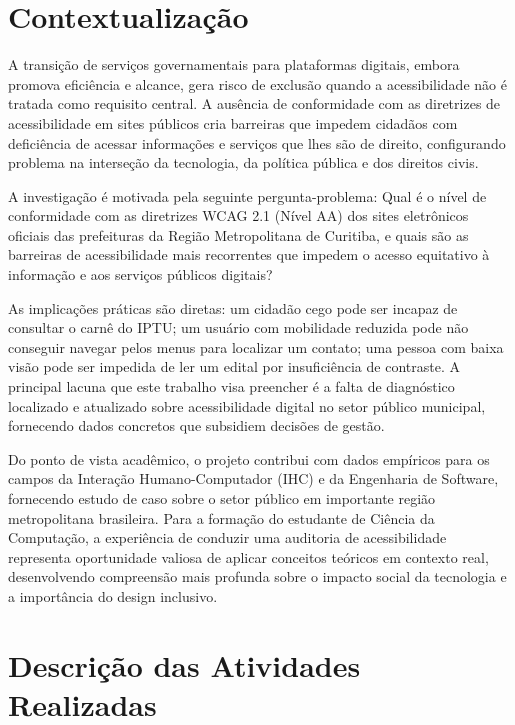 \documentclass[brazil]{ifpr-pinhais}
\begin{document}
\chapter{Contextualização}

A transição de serviços governamentais para plataformas digitais, embora promova eficiência e alcance, gera risco de exclusão quando a acessibilidade não é tratada como requisito central. A ausência de conformidade com as diretrizes de acessibilidade em sites públicos cria barreiras que impedem cidadãos com deficiência de acessar informações e serviços que lhes são de direito, configurando problema na interseção da tecnologia, da política pública e dos direitos civis.

A investigação é motivada pela seguinte pergunta-problema: Qual é o nível de conformidade com as diretrizes WCAG 2.1 (Nível AA) dos sites eletrônicos oficiais das prefeituras da Região Metropolitana de Curitiba, e quais são as barreiras de acessibilidade mais recorrentes que impedem o acesso equitativo à informação e aos serviços públicos digitais?

As implicações práticas são diretas: um cidadão cego pode ser incapaz de consultar o carnê do IPTU; um usuário com mobilidade reduzida pode não conseguir navegar pelos menus para localizar um contato; uma pessoa com baixa visão pode ser impedida de ler um edital por insuficiência de contraste. A principal lacuna que este trabalho visa preencher é a falta de diagnóstico localizado e atualizado sobre acessibilidade digital no setor público municipal, fornecendo dados concretos que subsidiem decisões de gestão.

Do ponto de vista acadêmico, o projeto contribui com dados empíricos para os campos da Interação Humano-Computador (IHC) e da Engenharia de Software, fornecendo estudo de caso sobre o setor público em importante região metropolitana brasileira. Para a formação do estudante de Ciência da Computação, a experiência de conduzir uma auditoria de acessibilidade representa oportunidade valiosa de aplicar conceitos teóricos em contexto real, desenvolvendo compreensão mais profunda sobre o impacto social da tecnologia e a importância do design inclusivo.

\chapter{Descrição das Atividades Realizadas}
\end{document}
